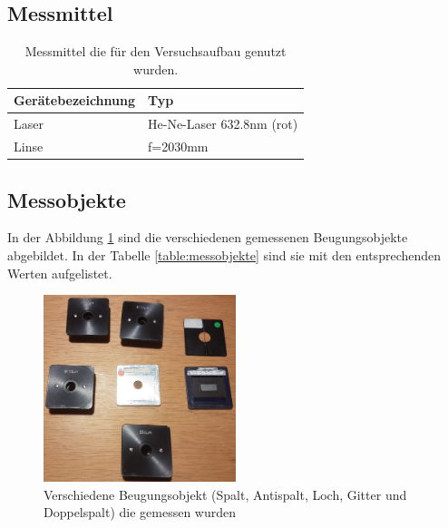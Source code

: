 \subsection{Messmittel}
\begin{table}[h!]
	\centering
	\begin{tabular}{|l|l|}
		\hline
		\rowcolor[rgb]{0.89,0.89,0.89}
		\textbf{Gerätebezeichnung} & \textbf{Typ}   \\ \hline
		Laser                      & He-Ne-Laser 632.8nm (rot)    \\ \hline
		Linse                      & f=2030mm                                     \\ \hline
	\end{tabular}
\caption{Messmittel die für den Versuchsaufbau genutzt wurden.}
\label{Messmittel}
\end{table}
\subsection{Messobjekte}
In der Abbildung \ref{fig:objekte} sind die verschiedenen gemessenen Beugungsobjekte abgebildet. In der Tabelle \ref{table:messobjekte} sind sie mit den entsprechenden Werten aufgelistet.
\begin{figure}[h!]
	\centering
	\includegraphics[width=0.5\textwidth]{data/objekte}
	\caption{Verschiedene Beugungsobjekt (Spalt, Antispalt, Loch, Gitter und Doppelspalt) die gemessen wurden}
	\label{fig:objekte}
\end{figure}

